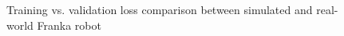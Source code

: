 \begin{figure}
    \centering
    \hfill
    \caption{Training vs. validation loss comparison between simulated and real-world Franka robot}
    \label{fig:HistSimVsReal}
\end{figure}

